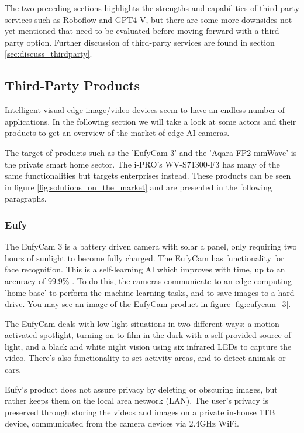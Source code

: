 The two preceding sections highlights the strengths and capabilities of third-party services such as Roboflow and GPT4-V, but there are some more downsides not yet mentioned that need to be evaluated before moving forward with a third-party option. Further discussion of third-party services are found in section \ref{sec:discuss_thirdparty}. 

\subsection{Third-Party Products}
\label{sec:thirdparty_products}
Intelligent visual edge image/video devices seem to have an endless number of applications. In the following section we will take a look at some actors and their products to get an overview of the market of edge AI cameras.

The target of products such as the 'EufyCam 3' and the 'Aqara FP2 mmWave' is the private smart home sector. The i-PRO's WV-S71300-F3 has many of the same functionalities but targets enterprises instead. These products can be seen in figure \ref{fig:solutions_on_the_market} and are presented in the following paragraphs.

\subsubsection{Eufy}
\label{sec:eufycam}
The EufyCam 3 is a battery driven camera with solar a panel, only requiring two hours of sunlight to become fully charged. The EufyCam has functionality for face recognition. This is a self-learning AI which improves with time, up to an accuracy of 99.9\% \cite{eufycam}. To do this, the cameras communicate to an edge computing 'home base' to perform the machine learning tasks, and to save images to a hard drive. You may see an image of the EufyCam product in figure \ref{fig:eufycam_3}.

The EufyCam deals with low light situations in two different ways: a motion activated spotlight, turning on to film in the dark with a self-provided source of light, and a black and white night vision using six infrared LEDs to capture the video. There's also functionality to set activity areas, and to detect animals or cars. 

Eufy's product does not assure privacy by deleting or obscuring images, but rather keeps them on the local area network (LAN). The user's privacy is preserved through storing the videos and images on a private in-house 1TB device, communicated from the camera devices via 2.4GHz WiFi.  

